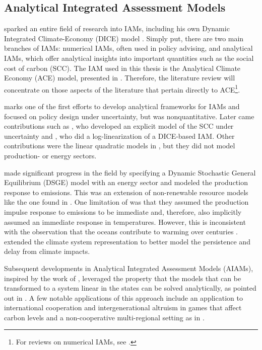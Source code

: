 \subsection{Analytical Integrated Assessment Models}

\textcite{NordhausWilliam1979} sparked an entire field of research into IAMs, including his own Dynamic Integrated Climate-Economy (DICE) model \parencite{NordhausWilliamD2011, NordhausWilliam2018PaUa, NordhausWilliam2023}. Simply put, there are two main branches of IAMs: numerical IAMs, often used in policy advising, and analytical IAMs, which offer analytical insights into important quantities such as the social cost of carbon (SCC). The IAM used in this thesis is the Analytical Climate Economy (ACE) model, presented in \textcite{TraegerChristian2023ACE}. Therefore, the literature review will concentrate on those aspects of the literature that pertain directly to ACE\footnote{For reviews on numerical IAMs, see \textcite{BosettiValentina2021, MetcalfStock2017}.}. 

\textcite{Heal1984} marks one of the first efforts to develop analytical frameworks for IAMs and focused on policy design under uncertainty, but was nonquantitative. Later came contributions such as \textcite{SchauerMichael1995}, who developed an explicit model of the SCC under uncertainty and \textcite{Pizer1999}, who did a log-linearization of a DICE-based IAM. Other contributions were the linear quadratic models in \textcite{HoelKarp2002, KarpZhang2012}, but they did not model production- or energy sectors.

\textcite{Golosov2014etal} made significant progress in the field by specifying a Dynamic Stochastic General Equilibrium (DSGE) model with an energy sector and modeled the production response to emissions. This was an extension of non-renewable resource models like the one found in \textcite{DasguptaHeal1974}. One limitation of \textcite{Golosov2014etal} was that they assumed the production impulse response to emissions to be immediate and, therefore, also implicitly assumed an immediate response in temperatures. However, this is inconsistent with the observation that the oceans contribute to warming over centuries \parencite{Abraham2022ocean_resp}. \textcite{GerlaghLiski2018} extended the climate system representation to better model the persistence and delay from climate impacts.

Subsequent developments in Analytical Integrated Assessment Models (AIAMs), inspired by the work of \textcite{Golosov2014etal}, leveraged the property that the models that can be transformed to a system linear in the states can be solved analytically, as pointed out in \textcite{Karp2017}. A few notable applications of this approach include an application to international cooperation and intergenerational altruism in games that affect carbon levels \parencite{Karp2017} and a non-cooperative multi-regional setting as in \textcite{Hambel2021non-coop-world}.

